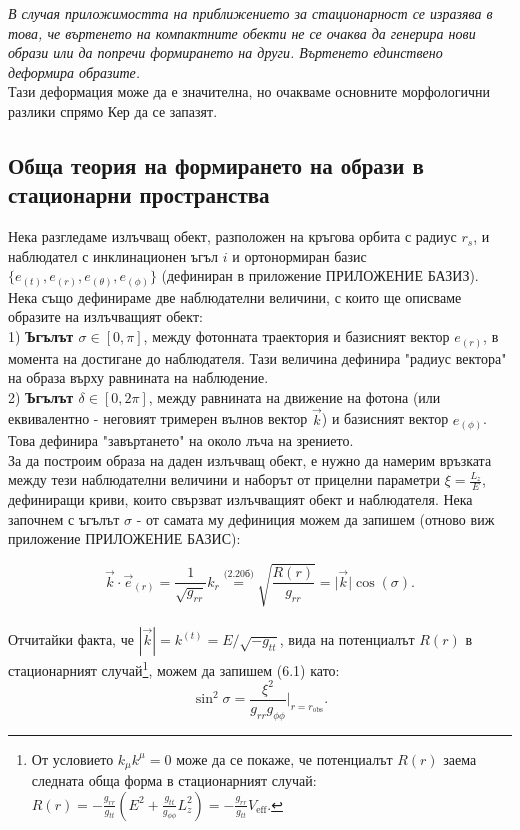 \emph{В случая приложимостта на приближението за стационарност се изразява в това, че въртенето на компактните обекти не се очаква да генерира нови образи или да попречи формирането на други. Въртенето единствено деформира образите.}\\

Тази деформация може да е значителна, но очакваме основните морфологични разлики спрямо Кер да се запазят.

\subsection{Обща теория на формирането на образи в стационарни пространства}

Нека разгледаме излъчващ обект, разположен на кръгова орбита с радиус $r_s$, и наблюдател с инклинационен ъгъл $i$ и ортонормиран базис $\{e_{(t)}, e_{(r)}, e_{(\theta)}, e_{(\phi)}\}$ (дефиниран в приложение ПРИЛОЖЕНИЕ БАЗИЗ). Нека също дефинираме две наблюдателни величини, с които ще описваме образите на излъчващият обект:\\

1) \textbf{Ъгълът $\sigma\in[0,\pi]$}, между фотонната траектория и базисният вектор $e_{(r)}$, в момента на достигане до наблюдателя. Тази величина дефинира "радиус вектора" на образа върху равнината на наблюдение.\\

2) \textbf{Ъгълът $\delta\in[0,2\pi]$}, между равнината на движение на фотона (или еквивалентно - неговият тримерен вълнов вектор $\vec{k}$) и базисният вектор $e_{(\phi)}$. Това дефинира "завъртането" на около лъча на зрението.\\

За да построим образа на даден излъчващ обект, е нужно да намерим връзката между тези наблюдателни величини и наборът от прицелни параметри $\xi = \frac{L_z}{E}$, дефиниращи криви, които свързват излъчващият обект и наблюдателя. Нека започнем с ъгълът $\sigma$ - от самата му дефиниция можем да запишем (отново виж приложение ПРИЛОЖЕНИЕ БАЗИС):

\begin{equation}
	\vec{k} \cdot \vec{e}_{(r)} = \frac{1}{\sqrt{g_{rr}}}k_{r} \stackrel{\text{(2.20б)}}{=} \sqrt{\frac{R(r)}{g_{rr}}} =  \big\vert \vec{k}\big\vert \cos(\sigma).
\end{equation}\\
Отчитайки факта, че $|\vec{k}| = k^{(t)} = E/\sqrt{-g_{tt}}$,  вида на потенциалът $R(r)$ в стационарният случай\footnote{От условието $k_\mu k^\mu = 0$ може да се покаже, че потенциалът $R(r)$ заема следната обща форма в стационарният случай: $R(r) = -\frac{g_{rr}}{g_{tt}}\left(E^2 + \frac{g_{tt}}{g_{\phi\phi}}L_z^2\right) = -\frac{g_{rr}}{g_{tt}} V_\text{eff}$.}, можем да запишем (6.1) като:
\begin{equation}
	\sin^2\sigma = \frac{\xi^2}{g_{rr}g_{\phi\phi}}\bigg\vert_{r = r_\text{obs}}.
\end{equation}

